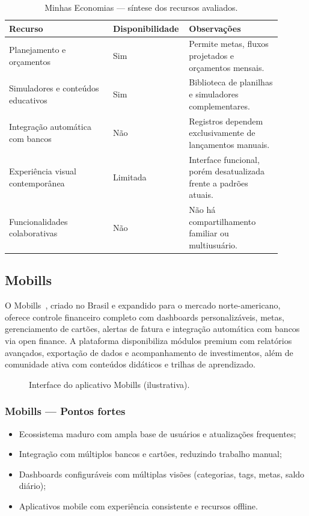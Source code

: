 \begin{table}[H]
\centering
\caption{Minhas Economias — síntese dos recursos avaliados.}
\label{tab:minhas_economias_comparativo}
\begin{tabular}{p{0.37\linewidth}p{0.2\linewidth}p{0.33\linewidth}}
\hline
\textbf{Recurso} & \textbf{Disponibilidade} & \textbf{Observações} \\
\hline
Planejamento e orçamentos & Sim & Permite metas, fluxos projetados e orçamentos mensais. \\
Simuladores e conteúdos educativos & Sim & Biblioteca de planilhas e simuladores complementares. \\
Integração automática com bancos & Não & Registros dependem exclusivamente de lançamentos manuais. \\
Experiência visual contemporânea & Limitada & Interface funcional, porém desatualizada frente a padrões atuais. \\
Funcionalidades colaborativas & Não & Não há compartilhamento familiar ou multiusuário. \\
\hline
\end{tabular}
\end{table}

\subsection{Mobills}\label{subsec:mobills}

O Mobills~\cite{MOBILLS2025}, criado no Brasil e expandido para o mercado norte-americano, oferece controle financeiro completo com dashboards personalizáveis, metas, gerenciamento de cartões, alertas de fatura e integração automática com bancos via open finance. A plataforma disponibiliza módulos premium com relatórios avançados, exportação de dados e acompanhamento de investimentos, além de comunidade ativa com conteúdos didáticos e trilhas de aprendizado.

\begin{figure}[H]
\centering
{}
\caption{Interface do aplicativo Mobills (ilustrativa).}
\label{fig:mobills}
\end{figure}

\subsubsection*{Mobills — Pontos fortes}
\begin{itemize}
    \item Ecossistema maduro com ampla base de usuários e atualizações frequentes;
    \item Integração com múltiplos bancos e cartões, reduzindo trabalho manual;
    \item Dashboards configuráveis com múltiplas visões (categorias, tags, metas, saldo diário);
    \item Aplicativos mobile com experiência consistente e recursos offline.
\end{itemize}

